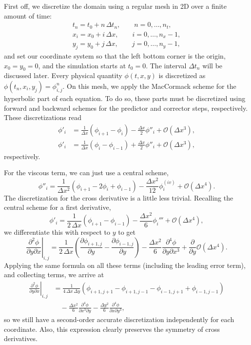 \documentclass[11pt]{article}
\newcommand{\ind}[4]{{#1}^{#2}_{#3,#4}}
\begin{document}
First off, we discretize the domain using a regular mesh in 2D over a finite amount of time:
\begin{align}
t_n = t_0 + n\,\Delta t_{n},\qquad n = 0,\hdots,n_t,\\
x_i = x_0 + i\,\Delta x,\qquad i = 0,\hdots,n_x-1,\\
y_j = y_0 + j\,\Delta x,\qquad j = 0,\hdots,n_y-1,
\end{align}
and set our coordinate system so that the left bottom corner is the origin, $x_0 = y_0 = 0$, and the simulation starts at $t_0 = 0$. The interval $\Delta t_{n}$ will be discussed later. Every physical quantity $\phi(t,x,y)$ is discretized as $\phi(t_n,x_i,y_j) = \ind{\phi}{n}{i}{j}$. On this mesh, we apply the MacCormack scheme for the hyperbolic part of each equation. To do so, these parts must be discretized using forward and backward schemes for the predictor and corrector steps, respectively. These discretizations read
\begin{align}
\phi'_i &= \frac{1}{\Delta x}\left(\phi_{i+1} - \phi_i \right) - \frac{\Delta x}{2}\phi''_i + \mathcal O(\Delta x^3),\\
\phi'_i &= \frac{1}{\Delta x}\left(\phi_i - \phi_{i-1} \right) + \frac{\Delta x}{2}\phi''_i + \mathcal O(\Delta x^3),
\end{align}
respectively. 

For the viscous term, we can just use a central scheme,
\begin{equation}
\phi''_i = \frac{1}{\Delta x^2}\left( \phi_{i+1} - 2\phi_i + \phi_{i-1} \right) - \frac{\Delta x^2}{12}\phi^{(iv)}_i + \mathcal O(\Delta x^4).
\end{equation}
The discretization for the cross derivative is a little less trivial. Recalling the central scheme for a first derivative,
\begin{equation}
\phi'_i = \frac{1}{2\,\Delta x}\left(\phi_{i+1} - \phi_{i-1}\right) - \frac{\Delta x^2}{6}\phi_i''' +  \mathcal O(\Delta x^4),
\end{equation}
we differentiate this with respect to $y$ to get
\begin{equation}
\left.\frac{\partial^2\phi}{\partial y \partial x}\right|_{i,j} = \frac{1}{2\,\Delta x}\left( \frac{\partial \phi_{i+1,j}}{\partial y} - \frac{\partial \phi_{i-1,j}}{\partial y} \right) - \frac{\Delta x^2}{6}\frac{\partial^4\phi}{\partial y\partial x^3} +  \frac{\partial}{\partial y}\mathcal O(\Delta x^4).
\end{equation}
Applying the same formula on all these terms (including the leading error term), and collecting terms, we arrive at
\begin{align}
\left.\frac{\partial^2\phi}{\partial y\partial x}\right|_{i,j} &= \frac{1}{4\,\Delta x\,\Delta y}\left( \phi_{i+1,j+1} - \phi_{i+1,j-1} - \phi_{i-1,j+1} + \phi_{i-1,j-1} \right)\\ 
&\quad- \frac{\Delta x^2}{6}\frac{\partial^4\phi}{\partial x^3\partial y} - \frac{\Delta y^2}{6}\frac{\partial^4\phi}{\partial x\partial y^3},
\end{align}
so we still have a second-order accurate discretization independently for each coordinate. Also, this expression clearly preserves the symmetry of cross derivatives.
\end{document}
